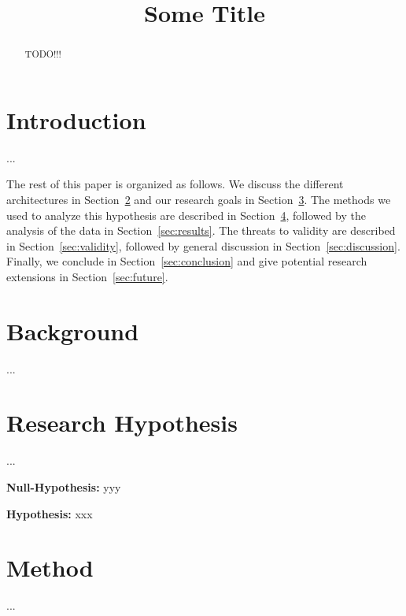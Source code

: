 \documentclass[conference]{IEEEtran}
\begin{document}
\title{Some Title}

\author{
	\and
}


\maketitle
\thispagestyle{plain}
\pagestyle{plain}

\begin{abstract}
TODO!!!
\end{abstract}

\section{Introduction}\label{sec:intro}
...

The rest of this paper is organized as follows.  We discuss the different architectures in Section~\ref{sec:back} and our research goals in Section~\ref{sec:hypothesis}.  The methods we used to analyze this hypothesis are described in Section~\ref{sec:method}, followed by the analysis of the data in Section~\ref{sec:results}.  The threats to validity are described in Section~\ref{sec:validity}, followed by general discussion in Section~\ref{sec:discussion}.  Finally, we conclude in Section~\ref{sec:conclusion} and give potential research extensions in Section~\ref{sec:future}.

\section{Background}\label{sec:back}
...

\section{Research Hypothesis}\label{sec:hypothesis}
...

\vspace{.5em}
\noindent\textbf{Null-Hypothesis:} yyy

\vspace{.5em}
\noindent\textbf{Hypothesis:} xxx

\section{Method}\label{sec:method}
...
\end{document}
